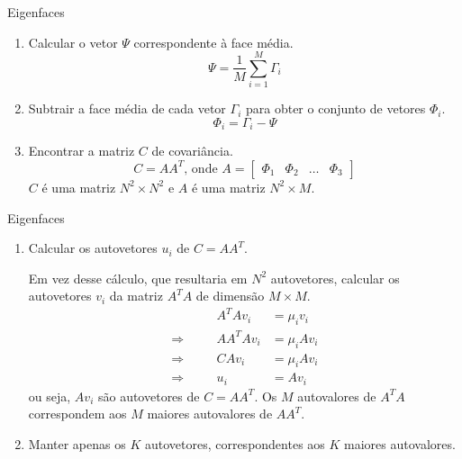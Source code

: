 \begin{frame}{Eigenfaces}
\begin{enumerate}
    \conti
    \item Calcular o vetor $\Psi$ correspondente à face média.
    \begin{equation*} \label{eq:eign_media}
        \Psi = \frac{1}{M}\sum_{i=1}^{M}\Gamma_i
    \end{equation*}
    \item Subtrair a face média de cada vetor $\Gamma_i$ para obter o conjunto de vetores $\Phi_i$.
    \begin{equation*} \label{eq:eign_phi}
        \Phi_i = \Gamma_i - \Psi
    \end{equation*}
    \item Encontrar a matriz $C$ de covariância.
    \begin{equation*} \label{eq:eign_c}
        C = AA^T \text{, onde } A = \begin{bmatrix}\Phi_1  & \Phi_2 & \ldots  & \Phi_3\end{bmatrix}
    \end{equation*}
    $C$ é uma matriz $N^2 \times N^2$ e $A$ é uma matriz $N^2 \times M$.
    \seti
\end{enumerate}
\end{frame}


\begin{frame}{Eigenfaces}
\begin{enumerate}
    \conti
    \item Calcular os autovetores $u_i$ de $C = AA^T$.
    
    Em vez desse cálculo, que resultaria em $N^2$ autovetores, calcular os autovetores $v_i$ da matriz $A^TA$ de dimensão $M \times M$.
    \begin{equation*} \label{eq:eign_autov}
    \begin{alignedat}{2}
                     && A^T Av_i    &= \mu_i v_i\\
    \Rightarrow\quad && AA^T Av_i   &= \mu_i Av_i\\
    \Rightarrow\quad && CAv_i       &= \mu_i Av_i\\
    \Rightarrow\quad && u_i         &= Av_i
    \end{alignedat}
    \end{equation*}
    ou seja, $Av_i$ são autovetores de $C = AA^T$. Os $M$ autovalores de $A^TA$ correspondem aos $M$ maiores autovalores de $AA^T$.
    \item Manter apenas os $K$ autovetores, correspondentes aos $K$ maiores autovalores.%
    \seti
\end{enumerate}
\end{frame}


